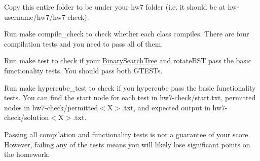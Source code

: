Copy this entire folder to be under your hw7 folder (i.\+e. it should be at hw-\/username/hw7/hw7-\/check).

Run {\ttfamily make compile\+\_\+check} to check whether each class compiles. There are four compilation tests and you need to pass all of them.

Run {\ttfamily make test} to check if your \mbox{\hyperlink{classBinarySearchTree}{Binary\+Search\+Tree}} and rotate\+B\+ST pass the basic functionality tests. You should pass both G\+T\+E\+S\+Ts.

Run {\ttfamily make hypercube\+\_\+test} to check if you hypercube pass the basic functionality tests. You can find the start node for each test in {\ttfamily hw7-\/check/start.\+txt}, permitted nodes in {\ttfamily hw7-\/check/permitted$<$X$>$.txt}, and expected output in {\ttfamily hw7-\/check/solution$<$X$>$.txt}.

Passing all compilation and functionality tests is not a guarantee of your score. However, failing any of the tests means you will likely lose significant points on the homework. 